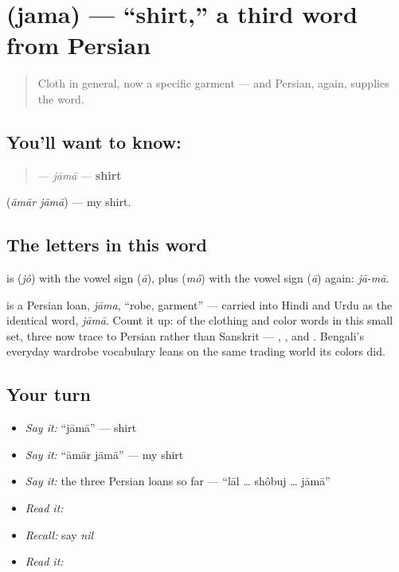 \section[\texorpdfstring{\bn{জামা} (jama)}{জামা (jama)}]{ (jama) — \textquotedblleft{}shirt,\textquotedblright{} a third word from Persian}

\label{lesson:BN-C15-jama}



\begin{quote}
Cloth in general, now a specific garment — and Persian, again, supplies the word.
\end{quote}

\subsection*{You'll want to know: }
\begin{quote}
\textbf{} — \emph{jāmā} — \textbf{shirt}
\end{quote}

  (\emph{āmār jāmā}) — my shirt.

\subsection*{The letters in this word}
\textbf{} is \textbf{} (\emph{jô}) with the vowel sign \textbf{} (\emph{ā}), plus \textbf{} (\emph{mô}) with the vowel sign \textbf{} (\emph{ā}) again: \emph{jā-mā}.

\begin{cousinweb}
\textbf{} is a Persian loan, \emph{jāma}, \textquotedblleft{}robe, garment\textquotedblright{} — carried into Hindi and Urdu as the identical word, \emph{jāmā}. Count it up: of the clothing and color words in this small set, three now trace to Persian rather than Sanskrit — \textbf{}, \textbf{}, and \textbf{}. Bengali's everyday wardrobe vocabulary leans on the same trading world its colors did.
\end{cousinweb}

\subsection*{Your turn}
\begin{itemize}
\raggedright
  \item \emph{Say it:} \textquotedblleft{}jāmā\textquotedblright{} — shirt
  \item \emph{Say it:} \textquotedblleft{}āmār jāmā\textquotedblright{} — my shirt
  \item \emph{Say it:} the three Persian loans so far — \textquotedblleft{}lāl … shôbuj … jāmā\textquotedblright{}
  \item \emph{Read it:} \textbf{}
  \item \emph{Recall:} say \emph{nil}
  \item \emph{Read it:} \textbf{}
\end{itemize}

